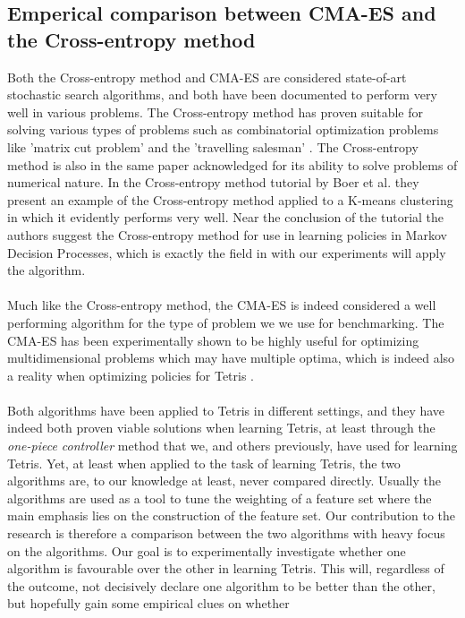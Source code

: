 \subsection{Emperical comparison between CMA-ES and the Cross-entropy method}

Both the Cross-entropy method and CMA-ES are considered state-of-art
stochastic search algorithms, and both have been documented to perform very well
in various problems. The Cross-entropy method has proven 
suitable for solving various types of problems such as 
combinatorial optimization problems like 'matrix cut problem'
and the 'travelling salesman' \citep{cetut2014}. 
The Cross-entropy method is also in the same paper acknowledged for
its ability to solve problems of numerical nature. In the 
Cross-entropy method tutorial by Boer et al. they present 
an example of the Cross-entropy method applied to 
a K-means clustering in which it evidently performs very well.
Near the conclusion of the tutorial the authors suggest the 
Cross-entropy method for use in learning policies in Markov Decision 
Processes, which is exactly the field in with our experiments will apply the
algorithm.\\
\\
Much like the Cross-entropy method, the CMA-ES is indeed considered
a well performing algorithm for the type of problem we we use for benchmarking.
The CMA-ES has been experimentally shown to be highly useful for optimizing multidimensional
problems which may have multiple optima, which is indeed also a reality when 
optimizing policies for Tetris \citep{hansen2004}.\\
\\
Both algorithms have been applied to Tetris in different settings, and they have
indeed both proven viable solutions when learning Tetris, at least through the
\textit{one-piece controller} method that we, and others previously, have used
for learning Tetris. Yet, at least when applied to the task of learning Tetris,
the two algorithms are, to our knowledge at least, never compared directly. Usually
the algorithms are used as a tool to tune the weighting of a feature set where the
main emphasis lies on the construction of the feature set. Our contribution to 
the research is therefore a comparison between the two algorithms
with heavy focus on the algorithms. Our goal is to experimentally investigate
whether one algorithm is favourable over the other in learning Tetris.
This will, regardless of the outcome, not decisively declare one algorithm 
to be better than the other, but hopefully gain some empirical clues on whether 
